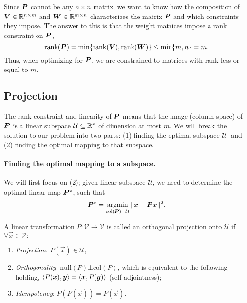 \begin{important}
    Since $\bm{P}$ cannot be any $n\times n$ matrix, we want to know how the composition of $\bm{V}
        \in \mathbb{R}^{n\times m}$ and $\bm{W} \in \mathbb{R}^{m\times n}$ characterizes the matrix $\bm{P}$ and which
    constraints they impose. The answer to this is that the weight matrices impose a rank constraint on
    $\bm{P}$, \[
        \mathrm{rank}(\bm{P}) = \min \{ \mathrm{rank}(\bm{V}), \mathrm{rank}(\bm{W}) \} \leq \min \{ m, n \} = m.
    \]
    Thus, when optimizing for $\bm{P}$, we are constrained to matrices with rank less or equal to $m$.
\end{important}

\subsection{Projection}

The rank constraint and linearity of $\bm{P}$ means that the image (column space) of $\bm{P}$ is
a linear subspace $\mathcal{U} \subseteq \mathbb{R}^n$ of dimension at most $m$. We will break the solution
to our problem into two parts: (1) finding the optimal subspace $\mathcal{U}$, and (2) finding the
optimal mapping to that subspace.

\paragraph{Finding the optimal mapping to a subspace.}

We will first focus on (2); given linear subspace $\mathcal{U}$, we need to determine the optimal
linear map $\bm{P}^\star$, such that \[
    \bm{P}^\star = \operatorname*{argmin}_{\mathrm{col}(\bm{P}) = \mathcal{U}} \| \bm{x} - \bm{P}\bm{x} \|^2.
\]

\begin{definition}
    \label{def:orthogonal-projection}

    A linear transformation $P: \mathcal{V} \to \mathcal{V}$ is called an orthogonal projection onto
    $\mathcal{U}$ if $\forall \vec{x}\in \mathcal{V}:$
    \begin{enumerate}
        \item \textit{Projection}: $P(\vec{x}) \in \mathcal{U}$;
        \item \textit{Orthogonality}: $\mathrm{null}(P) \bot \mathrm{col}(P)$, which is equivalent to
              the following holding, $\langle P(\bm{x}), \bm{y} \rangle = \langle \bm{x},P(\bm{y}) \rangle$ (self-adjointness);
        \item \textit{Idempotency}: $P(P(\vec{x})) = P(\vec{x})$.
    \end{enumerate}
\end{definition}

